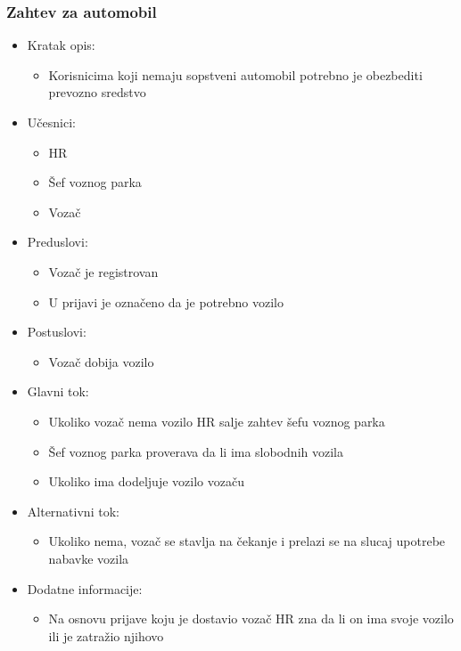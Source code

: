 \subsubsection{\bfseries Zahtev za automobil}
\begin{itemize}
	\item Kratak opis:
		\begin{itemize}
			\item Korisnicima koji nemaju sopstveni automobil potrebno je obezbediti prevozno sredstvo		
		\end{itemize}

	\item Učesnici:
		\begin{itemize}
		    \item HR
		    \item Šef voznog parka
		    \item Vozač
		\end{itemize}


	\item Preduslovi:
		\begin{itemize}
		    \item Vozač je registrovan
		    \item U prijavi je označeno da je potrebno vozilo
		\end{itemize}


	\item Postuslovi:
		\begin{itemize}
			\item Vozač dobija vozilo
	\end{itemize}

	\item Glavni tok:
		\begin{itemize}
		    \item Ukoliko vozač nema vozilo HR salje zahtev šefu voznog parka
		    \item Šef voznog parka proverava da li ima slobodnih vozila
		    \item Ukoliko ima dodeljuje vozilo vozaču
		\end{itemize}

	\item Alternativni tok:
		\begin{itemize}
		    \item Ukoliko nema, vozač se stavlja na čekanje i prelazi se na slucaj upotrebe nabavke vozila
		\end{itemize}

	\item Dodatne informacije:
		\begin{itemize}
			\item Na osnovu prijave koju je dostavio vozač HR zna da li on ima svoje vozilo ili je zatražio njihovo
		\end{itemize}

\end{itemize}


